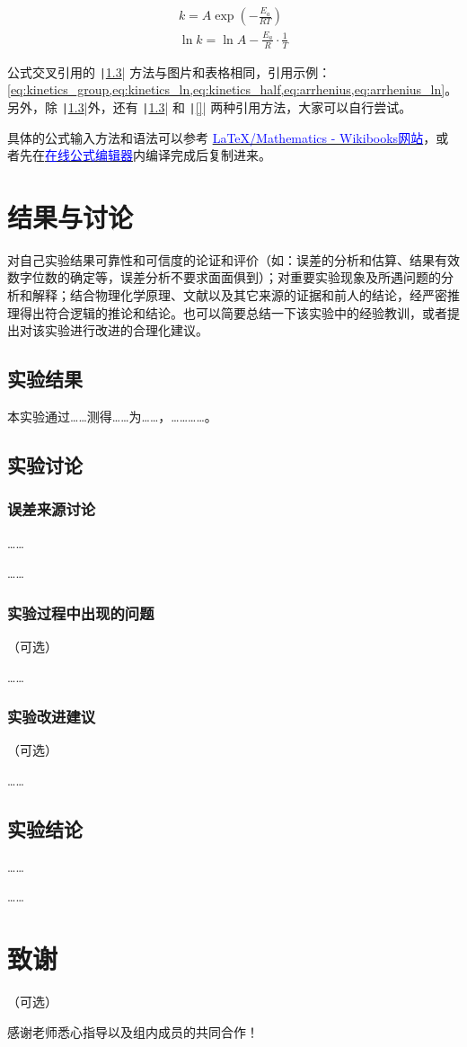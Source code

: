\documentclass[a4paper,12pt]{article}
\begin{document}
\begin{gather}
    k = A\exp\left(-\frac{E_a}{RT}\right) \label{eq:arrhenius} \\
    \ln k = \ln A - \frac{E_a}{R}\cdot\frac{1}{T} \label{eq:arrhenius_ln}
\end{gather}

公式交叉引用的 \texttt|\cref{}| 方法与图片和表格相同，引用示例：\cref{eq:kinetics_group,eq:kinetics_ln,eq:kinetics_half,eq:arrhenius,eq:arrhenius_ln}。另外，除 \texttt|\cref{}|外，还有 \texttt|\ref{}| 和 \texttt|\eqref{}| 两种引用方法，大家可以自行尝试。

具体的公式输入方法和语法可以参考 \href{https://en.wikibooks.org/wiki/LaTeX/Mathematics}{\textcolor{blue}{LaTeX/Mathematics - Wikibooks网站}}，或者先在\href{https://www.latexlive.com}{\textcolor{blue}{在线公式编辑器}}内编译完成后复制进来。

\vspace{1cm}
\section{结果与讨论}
\label{sec:result}

对自己实验结果可靠性和可信度的论证和评价（如：误差的分析和估算、结果有效数字位数的确定等，误差分析不要求面面俱到）；对重要实验现象及所遇问题的分析和解释；结合物理化学原理、文献以及其它来源的证据和前人的结论，经严密推理得出符合逻辑的推论和结论。也可以简要总结一下该实验中的经验教训，或者提出对该实验进行改进的合理化建议。

\subsection{实验结果}
本实验通过……测得……为……，…………。

\subsection{实验讨论}

\subsubsection{误差来源讨论}
……

……

\subsubsection{实验过程中出现的问题}
（可选）

……

\subsubsection{实验改进建议}
（可选）

……

\subsection{实验结论}
……

……

\vspace{1cm}
\section*{致谢}
（可选）

感谢老师悉心指导以及组内成员的共同合作！

\vspace{1cm}
\printbibliography
\end{document}
